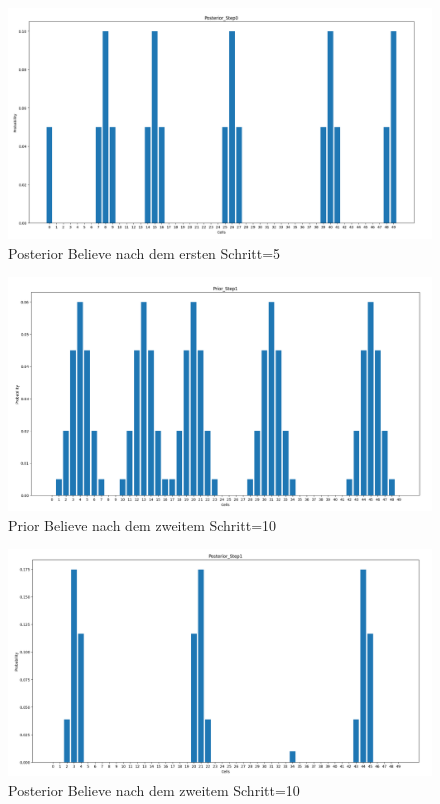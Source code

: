 \documentclass[12pt]{article}
\begin{document}
\begin{figure}[h]
    \centering
    \includegraphics[width=1.3\textwidth]{img/posterior_step_0.png}
    \caption{Posterior Believe nach dem ersten Schritt=5}
    \label{fig:Posterior Believe nach dem ersten Schritt=5}
\end{figure}

\begin{figure}[h]
    \centering
    \includegraphics[width=1.3\textwidth]{img/prior_step_1.png}
    \caption{Prior Believe nach dem zweitem Schritt=10}
    \label{fig:Prior Believe nach dem zweitem Schritt=10}
\end{figure}

\begin{figure}[h]
    \centering
    \includegraphics[width=1.3\textwidth]{img/posterior_step_1.png}
    \caption{Posterior Believe nach dem zweitem Schritt=10}
    \label{fig:Posterior Believe nach dem zweitem Schritt=10}
\end{figure}
\end{document}
